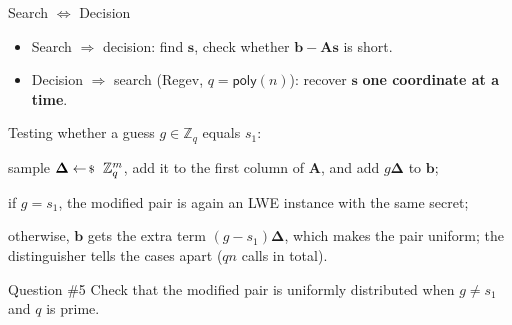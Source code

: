 \documentclass{zkdl-presentation-template}
\begin{document}
    \begin{frame}{Search $\Leftrightarrow$ Decision}
        \begin{itemize}
            \item Search $\Rightarrow$ decision: find $\mathbf{s}$, check whether $\mathbf{b}-\mathbf{A}\mathbf{s}$ is short.\pause
            \item Decision $\Rightarrow$ search (Regev, $q = \mathsf{poly}(n)$): recover $\mathbf{s}$ \textbf{one coordinate at a time}.
        \end{itemize}
        \pause

        Testing whether a guess $g \in \mathbb{Z}_q$ equals $s_1$:
        \begin{algoen}
            \item sample $\boldsymbol{\Delta} \leftarrowS \mathbb{Z}_q^m$, add it to the first column of $\mathbf{A}$, and add $g\boldsymbol{\Delta}$ to $\mathbf{b}$;\pause
            \item if $g = s_1$, the modified pair is again an LWE instance with the same secret;\pause
            \item otherwise, $\mathbf{b}$ gets the extra term $(g-s_1)\boldsymbol{\Delta}$, which makes the pair uniform; the distinguisher tells the cases apart ($qn$ calls in total).
        \end{algoen}
        \pause

        \begin{questionblock}{Question \#5}
            Check that the modified pair is uniformly distributed when $g \neq s_1$ and $q$ is prime.
        \end{questionblock}
    \end{frame}
\end{document}
